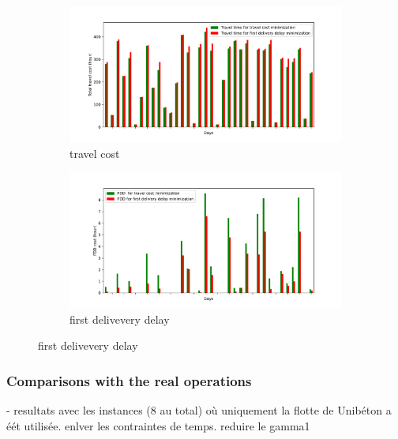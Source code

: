 \documentclass{article}
\begin{document}
\begin{figure}[!ht]
    \centering
    \begin{subfigure}{0.5\textwidth}
        \includegraphics[width=\linewidth]{travel.pdf}
        \vspace*{-2em}
        \caption{travel cost}
        \label{fig:travel}
    \end{subfigure}%
    \hfill%
    \begin{subfigure}{0.5\textwidth}
        \includegraphics[width=\linewidth]{FDD.pdf}
        \vspace*{-2em}
        \caption{first delivevery delay}
        \label{fig:fdd}
    \end{subfigure}
    \vspace*{-1mm}

\end{figure}

\subsubsection{Comparisons with the real operations}

- resultats avec les instances (8 au total) où uniquement la flotte de Unibéton a éét utilisée.
enlver les contraintes de temps. reduire le gamma1
\end{document}
